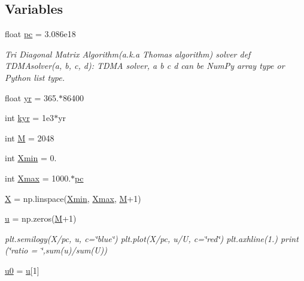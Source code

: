 \subsection*{Variables}
\begin{DoxyCompactItemize}
\item 
float \hyperlink{namespacePDE__solvers_a71c07d7118cdda8c71573599545d0017}{pc} = 3.\+086e18
\begin{DoxyCompactList}\small\item\em Tri Diagonal Matrix Algorithm(a.\+k.\+a Thomas algorithm) solver def T\+D\+M\+Asolver(a, b, c, d)\+: \textquotesingle{}\textquotesingle{}\textquotesingle{} T\+D\+MA solver, a b c d can be Num\+Py array type or Python list type. \end{DoxyCompactList}\item 
float \hyperlink{namespacePDE__solvers_a400304049742ae9f9b048c40cb6a52cb}{yr} = 365.$\ast$86400
\item 
int \hyperlink{namespacePDE__solvers_a17e611d575d9a8bda46ea6b596138f12}{kyr} = 1e3$\ast$yr
\item 
int \hyperlink{namespacePDE__solvers_a9d6fca7c2abdff4c2c7feec55d437940}{M} = 2048
\item 
int \hyperlink{namespacePDE__solvers_a7a1ac835675841b757a70f18b51246dc}{Xmin} = 0.
\item 
int \hyperlink{namespacePDE__solvers_a48fb209db97ce5937802d0a747fb9991}{Xmax} = 1000.$\ast$\hyperlink{namespacePDE__solvers_a71c07d7118cdda8c71573599545d0017}{pc}
\item 
\hyperlink{namespacePDE__solvers_ab53183fc05bd900f7013cd056e2e7338}{X} = np.\+linspace(\hyperlink{namespacePDE__solvers_a7a1ac835675841b757a70f18b51246dc}{Xmin}, \hyperlink{namespacePDE__solvers_a48fb209db97ce5937802d0a747fb9991}{Xmax}, \hyperlink{namespacePDE__solvers_a9d6fca7c2abdff4c2c7feec55d437940}{M}+1)
\item 
\hyperlink{namespacePDE__solvers_abaa9fdf113a88661fc0afa93032755d3}{u} = np.\+zeros(\hyperlink{namespacePDE__solvers_a9d6fca7c2abdff4c2c7feec55d437940}{M}+1)
\begin{DoxyCompactList}\small\item\em plt.\+semilogy(X/pc, u, c=\char`\"{}blue\char`\"{}) plt.\+plot(X/pc, u/U, c=\char`\"{}red\char`\"{}) plt.\+axhline(1.) print (\char`\"{}ratio = \char`\"{},sum(u)/sum(U)) \end{DoxyCompactList}\item 
\hyperlink{namespacePDE__solvers_aecb3894d7f844fe950ec6e4eb6ab14c6}{u0} = \hyperlink{namespacePDE__solvers_abaa9fdf113a88661fc0afa93032755d3}{u}\mbox{[}1\mbox{]}

\end{DoxyCompactItemize}
